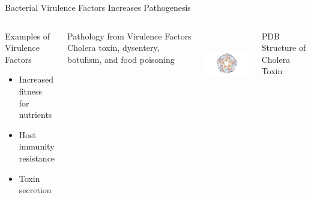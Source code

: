 \documentclass[11pt]{beamer}
\begin{document}
	\begin{frame}{Bacterial Virulence Factors Increases Pathogenesis}
	\begin{columns}
	\begin{block}{Examples of Virulence Factors}
		\begin{itemize}
		\item Increased fitness for nutrients
		\item Host immunity resistance
		\item Toxin secretion
		\end{itemize}
	\end{block} 
	
	\begin{block}{Pathology from Virulence Factors}
	Cholera toxin, dysentery, botulism, and food poisoning
	\end{block}
	

	\includegraphics[height=3cm, width=5cm]{cholera.png}

	\vspace{-0.3cm}
	\hspace{0.5cm}	
	\tiny{PDB Structure of Cholera Toxin}
	\end{columns}
	
	\end{frame}
	
	
\end{document}
